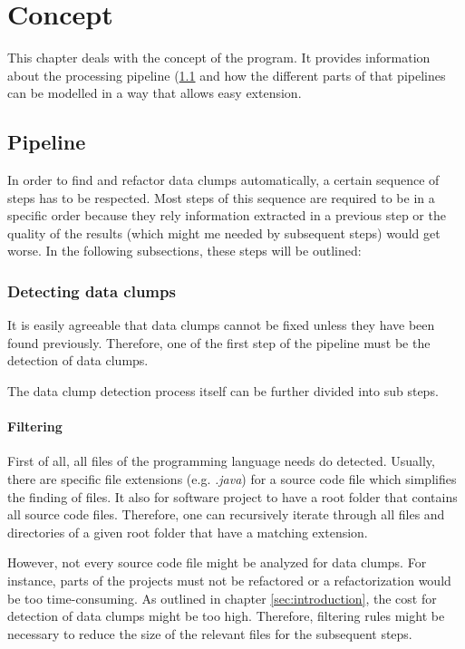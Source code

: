 \begingroup
\renewcommand{\cleardoublepage}{} %
\renewcommand{\clearpage}{}
\chapter{Concept}\label{chapter_conception}
\endgroup
This chapter deals with  the concept of the program. It provides information about the processing pipeline (\ref{chapter:pipeline} and how the different parts of that pipelines can be modelled in a way that allows easy extension. 


\hfill
\section{Pipeline}\label{chapter:pipeline}
In order to find and refactor data clumps automatically, a certain sequence of steps has to be respected. Most steps of this sequence are required to be in a specific order because they rely information extracted in a previous step or the quality of the results (which might me needed by subsequent steps) would get worse. In the following subsections, these steps will be outlined:

\subsection{Detecting data clumps}\label{subsec:chap3_data_clump_detection}
It is easily agreeable that data clumps cannot be fixed unless they have been found previously. Therefore, one of the first step of the pipeline must be the detection of data clumps. 

The data clump detection process itself can be further divided into sub steps.
\subsubsection{Filtering}\label{subsub:filtering_files}
First of all, all files of the programming language needs do detected. Usually, there are specific file extensions (e.g. \textit{.java}) for a source code file which simplifies the finding of files. It also for software project to have a root folder that contains all source code files. Therefore, one can recursively iterate through all files and directories of a given root folder that have a matching extension. 

However, not every source code file might be analyzed for data clumps. For instance, parts of the projects must not be refactored or a refactorization would be too time-consuming. As outlined in chapter \ref{sec:introduction}, the cost for detection of data clumps might be too high. Therefore, filtering rules might be necessary to reduce the size of the relevant files for the subsequent steps.  

